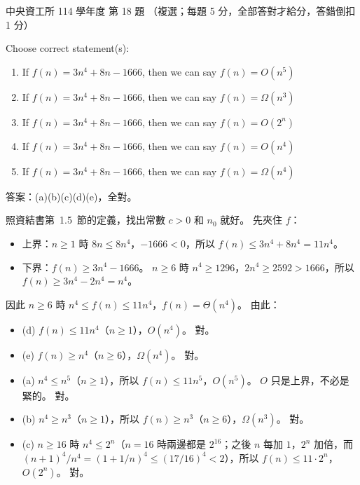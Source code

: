 \begin{pastexam}[label={px:ncu-114-dsa-18}]{中央資工所 114 學年度 第 18 題}
（複選；每題 5 分，全部答對才給分，答錯倒扣 1 分）

Choose correct statement(s):
\begin{enumerate}[label=(\alph*)]
\item If $f(n)=3n^4+8n-1666$, then we can say $f(n)=O(n^5)$
\item If $f(n)=3n^4+8n-1666$, then we can say $f(n)=\Omega(n^3)$
\item If $f(n)=3n^4+8n-1666$, then we can say $f(n)=O(2^n)$
\item If $f(n)=3n^4+8n-1666$, then we can say $f(n)=O(n^4)$
\item If $f(n)=3n^4+8n-1666$, then we can say $f(n)=\Omega(n^4)$
\end{enumerate}
\end{pastexam}

\begin{pastsoln}
答案：(a)(b)(c)(d)(e)，全對。

照資結書第~1.5~節的定義，找出常數 $c > 0$ 和 $n_0$ 就好。 先夾住 $f$：
\begin{itemize}
\item 上界：$n \ge 1$ 時 $8n \le 8n^4$，$-1666 < 0$，所以 $f(n) \le 3n^4 + 8n^4 = 11n^4$。
\item 下界：$f(n) \ge 3n^4 - 1666$。 $n \ge 6$ 時 $n^4 \ge 1296$，$2n^4 \ge 2592 > 1666$，所以
$f(n) \ge 3n^4 - 2n^4 = n^4$。
\end{itemize}
因此 $n \ge 6$ 時 $n^4 \le f(n) \le 11n^4$，$f(n) = \Theta(n^4)$。 由此：
\begin{itemize}
\item (d) $f(n) \le 11n^4$（$n \ge 1$），$O(n^4)$。 對。
\item (e) $f(n) \ge n^4$（$n \ge 6$），$\Omega(n^4)$。 對。
\item (a) $n^4 \le n^5$（$n \ge 1$），所以 $f(n) \le 11n^5$，$O(n^5)$。 $O$ 只是上界，不必是緊的。 對。
\item (b) $n^4 \ge n^3$（$n \ge 1$），所以 $f(n) \ge n^3$（$n \ge 6$），$\Omega(n^3)$。 對。
\item (c) $n \ge 16$ 時 $n^4 \le 2^n$（$n = 16$ 時兩邊都是 $2^{16}$；之後 $n$ 每加 $1$，$2^n$ 加倍，而
$(n+1)^4/n^4 = (1 + 1/n)^4 \le (17/16)^4 < 2$），所以 $f(n) \le 11 \cdot 2^n$，$O(2^n)$。 對。
\end{itemize}
\end{pastsoln}
